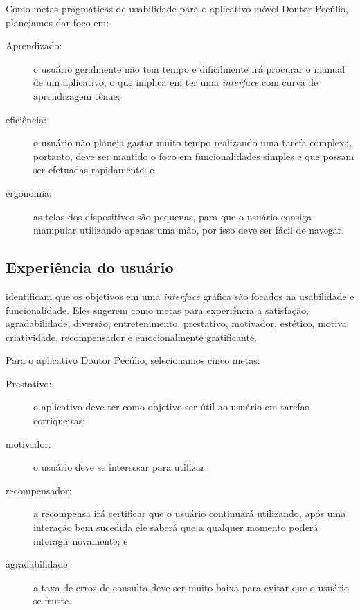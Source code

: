 Como metas pragmáticas de usabilidade para o aplicativo móvel Doutor Pecúlio,
planejamos dar foco em:

\begin{description}
    \item[Aprendizado:] o usuário geralmente não tem tempo e dificilmente
        irá procurar o manual de um aplicativo, o que implica em ter 
        uma \textit{interface} com curva de aprendizagem tênue;
    \item[eficiência:] o usuário não planeja gastar muito tempo
        realizando uma tarefa complexa, portanto, deve ser mantido o
        foco em funcionalidades simples e que possam ser efetuadas
        rapidamente; e
    \item[ergonomia:] as telas dos dispositivos são pequenas, para que o 
        usuário consiga manipular utilizando apenas uma mão, por isso deve
        ser fácil de navegar.
\end{description}

\subsection{Experiência do usuário}

 identificam que os objetivos em uma
\textit{interface} gráfica são focados na usabilidade e funcionalidade.
Eles sugerem como metas para experiência a satisfação, agradabilidade,
diversão, entretenimento, prestativo, motivador, estético, motiva
criatividade, recompensador e emocionalmente gratificante.

Para o aplicativo Doutor Pecúlio, selecionamos cinco metas:

\begin{description}
    \item[Prestativo:] o aplicativo deve ter como objetivo ser útil ao 
        usuário em tarefas corriqueiras;
    \item[motivador:] o usuário deve se interessar para utilizar;
    \item[recompensador:] a recompensa irá certificar que o usuário 
        continuará utilizando, após uma interação bem sucedida ele saberá
        que a qualquer momento poderá interagir novamente; e
    \item[agradabilidade:] a taxa de erros de consulta deve ser muito 
        baixa para evitar que o usuário se fruste.
\end{description}

